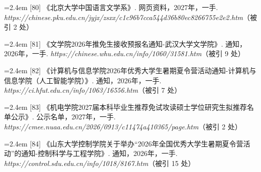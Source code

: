 {\vspace{0.6pt}
\noindent\hangindent=2.4em \label{src:S0096}{\color{cAccent}[80]} 《北京大学中国语言文学系》. 网页资料，2027年，一手. \textit{https://chinese.pku.edu.cn/jyjx/zsxx/c1c96b7cca544d36b80ec8266755e2e2.htm}（被引 2 处）\par
\vspace{0.6pt}
\vspace{3.5pt}\par
\nopagebreak\vspace{1pt}
\noindent\hangindent=2.4em \label{src:S0097}{\color{cAccent}[81]} 《文学院2026年推免生接收预报名通知-武汉大学文学院》. 通知，2026年，一手. \textit{https://chinese.whu.edu.cn/info/1060/31581.htm}（被引 9 处）\par
\vspace{0.6pt}
\vspace{3.5pt}\par
\nopagebreak\vspace{1pt}
\noindent\hangindent=2.4em \label{src:S0098}{\color{cAccent}[82]} 《计算机与信息学院2026年优秀大学生暑期夏令营活动通知-计算机与信息学院（人工智能学院）》. 通知，2026年，一手. \textit{https://ci.hfut.edu.cn/info/1063/16556.htm}（被引 7 处）\par
\vspace{0.6pt}
\vspace{3.5pt}\par
\nopagebreak\vspace{1pt}
\noindent\hangindent=2.4em \label{src:S0100}{\color{cAccent}[83]} 《机电学院2027届本科毕业生推荐免试攻读硕士学位研究生拟推荐名单公示》. 公示名单，2027年，一手. \textit{https://cmee.nuaa.edu.cn/2026/0913/c11474a410365/page.htm}（被引 2 处）\par
\vspace{0.6pt}
\vspace{3.5pt}\par
\nopagebreak\vspace{1pt}
\noindent\hangindent=2.4em \label{src:S0102}{\color{cAccent}[84]} 《山东大学控制学院关于举办“2026年全国优秀大学生暑期夏令营活动”的通知-控制科学与工程学院》. 通知，2026年，一手. \textit{https://control.sdu.edu.cn/info/1018/8167.htm}（被引 15 处）\par
\vspace{0.6pt}
\vspace{3.5pt}\par
}
